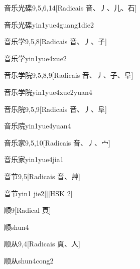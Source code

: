 \begin{entry}{音乐光碟}{9,5,6,14}[Radicais ⾳、⼃、⼉、⽯]
  \begin{phonetics}{音乐光碟}{yin1yue4guang1die2}
  \end{phonetics}
\end{entry}

\begin{entry}{音乐学}{9,5,8}[Radicais ⾳、⼃、⼦]
  \begin{phonetics}{音乐学}{yin1yue4xue2}
  \end{phonetics}
\end{entry}

\begin{entry}{音乐学院}{9,5,8,9}[Radicais ⾳、⼃、⼦、⾩]
  \begin{phonetics}{音乐学院}{yin1yue4xue2yuan4}
  \end{phonetics}
\end{entry}

\begin{entry}{音乐院}{9,5,9}[Radicais ⾳、⼃、⾩]
  \begin{phonetics}{音乐院}{yin1yue4yuan4}
  \end{phonetics}
\end{entry}

\begin{entry}{音乐家}{9,5,10}[Radicais ⾳、⼃、⼧]
  \begin{phonetics}{音乐家}{yin1yue4jia1}
  \end{phonetics}
\end{entry}

\begin{entry}{音节}{9,5}[Radicais ⾳、⾋]
  \begin{phonetics}{音节}{yin1 jie2}[][HSK 2]
  \end{phonetics}
\end{entry}

\begin{entry}{顺}{9}[Radical ⾴]
  \begin{phonetics}{顺}{shun4}
  \end{phonetics}
\end{entry}

\begin{entry}{顺从}{9,4}[Radicais ⾴、⼈]
  \begin{phonetics}{顺从}{shun4cong2}
  \end{phonetics}
\end{entry}

